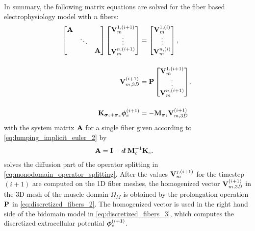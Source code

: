 In summary, the following matrix equations are solved for the fiber based electrophysiology model with $n$ fibers:
\begin{subequations}\label{eq:discretized_fibers}
  \begin{align}
    \left[\begin{array}{@{}ccc@{}}
      \bfA &&\\
      &\ddots&\\
      &&\bfA
    \end{array}\right]
    \left[\begin{array}{@{}c@{}}
      \bfV_{m}^{1,(i+1)}  \\
      \vdots\\
      \bfV_{m}^{n,(i+1)}
    \end{array}\right]
    &= 
    \left[\begin{array}{@{}c@{}}
      \bfV_{m}^{1,(i)}  \\
      \vdots\\
      \bfV_{m}^{n,(i)}
    \end{array}\right],\label{eq:discretized_fibers_1} \\[4mm]
    \bfV_{m,3D}^{(i+1)} &= \bfP \left[\begin{array}{@{}c@{}}
      \bfV_{m}^{1,(i+1)} \label{eq:discretized_fibers_2} \\
      \vdots\\
      \bfV_{m}^{n,(i+1)}
    \end{array}\right],\\[4mm]
    \bfK_{\bfsigma_i + \bfsigma_e} \bfphi_e^{(i+1)} &= -\bfM_{\bfsigma_i} \bfV_{m,3D}^{(i+1)} \label{eq:discretized_fibers_3}
  \end{align}
\end{subequations}
with the system matrix $\textbf{A}$ for a single fiber given according to \cref{eq:lumping_implicit_euler_2} by
\begin{align*}
  \bfA &= \bfI - \dt\,\bfM_c^{-1}\bfK_c.
\end{align*}
 solves the diffusion part of the operator splitting in \cref{eq:monodomain_operator_splitting}. After the values $\textbf{V}_{m}^{j,(i+1)}$ for the timestep $(i+1)$ are computed on the 1D fiber meshes, the homogenized vector $\textbf{V}_{m,3D}^{(i+1)}$ in the 3D mesh of the muscle domain $\Omega_M$ is obtained by the prolongation operation $\textbf{P}$ in \cref{eq:discretized_fibers_2}. The homogenized vector is used in the right hand side of the bidomain model in \cref{eq:discretized_fibers_3}, which computes the discretized extracellular potential $\boldsymbol{\phi}_e^{(i+1)}$.


